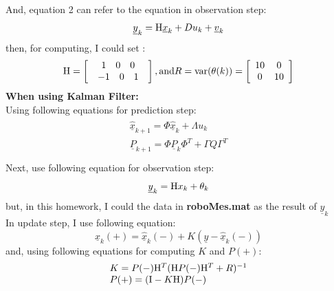\documentclass{article}
\begin{document}
\noindent And, equation 2 can refer to the equation in observation step:
\begin{equation}
	\underline{y}_k  = {\rm H}\underline{x}_k  + Du_k  + \underline{v}_k 
\end{equation}
then, for computing, I could set :
\begin{equation}
	{\rm H} = \left[ {\begin{array}{*{20}c}
	   {\begin{array}{*{20}c}
	   1 & 0 & 0  \\
	\end{array}}  \\
	   {\begin{array}{*{20}c}
	   { - 1} & 0 & 1  \\
	\end{array}}  \\
	\end{array}} \right],{\rm{ and }}R = {\mathop{\rm var}} (\theta (k)) = \left[ {\begin{array}{*{20}c}
	   {10} & 0  \\
	   0 & {10}  \\
	\end{array}} \right]
\end{equation}
\textbf{When using Kalman Filter:}\\
Using following equations for prediction step:
\begin{eqnarray}
	\begin{array}{l}
	 \hat{ \underline{x}}_{k + 1}  = \Phi  \hat{ \underline{x}}_k  + \Lambda u_k  \\ 
	 \underline{P}_{k + 1}  = \Phi \underline{P}_k \Phi ^T  + \Gamma Q\Gamma ^T  \\ 
	 \end{array}
\end{eqnarray}
Next, use following equation for observation step:
\begin{equation}
	\underline{y}_k  = {\rm H}x_k  + \theta _k 
\end{equation}
but, in this homework, I could the data in \textbf{roboMes.mat} as the result of $\underline{y}_k$\\
In update step, I use following equation:
\begin{equation}
	\hat{\underline{x}}_k ( + ) = \hat{\underline{x}}_k ( - ) + K(\underline{y} - \hat{\underline{x}}_k ( - ))
\end{equation}
and, using following equations for computing $K$ and $P(+)$:
\begin{eqnarray}
	\begin{array}{l}
	 K = P( - ){\rm H}^T ({\rm H}P( - ){\rm H}^T  + R)^{ - 1}  \\ 
	 P( + ) = ({\rm I} - K{\rm H})P( - ) \\ 
	 \end{array}
\end{eqnarray}
\end{document}
